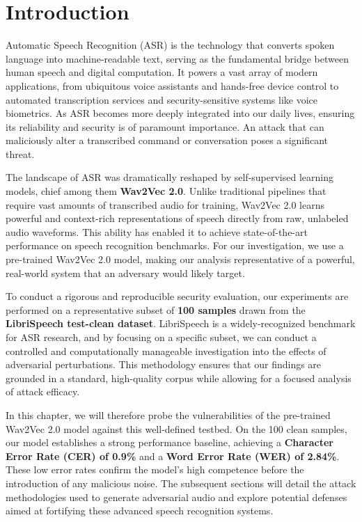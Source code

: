 \documentclass[../main.tex]{subfiles}
\begin{document}
\section{Introduction}
\label{sec:asr_intro}

Automatic Speech Recognition (ASR) is the technology that converts spoken language into machine-readable text, serving as the fundamental bridge between human speech and digital computation. It powers a vast array of modern applications, from ubiquitous voice assistants and hands-free device control to automated transcription services and security-sensitive systems like voice biometrics. As ASR becomes more deeply integrated into our daily lives, ensuring its reliability and security is of paramount importance. An attack that can maliciously alter a transcribed command or conversation poses a significant threat.

The landscape of ASR was dramatically reshaped by self-supervised learning models, chief among them \textbf{Wav2Vec 2.0}. Unlike traditional pipelines that require vast amounts of transcribed audio for training, Wav2Vec 2.0 learns powerful and context-rich representations of speech directly from raw, unlabeled audio waveforms. This ability has enabled it to achieve state-of-the-art performance on speech recognition benchmarks. For our investigation, we use a pre-trained Wav2Vec 2.0 model, making our analysis representative of a powerful, real-world system that an adversary would likely target.

To conduct a rigorous and reproducible security evaluation, our experiments are performed on a representative subset of \textbf{100 samples} drawn from the \textbf{LibriSpeech test-clean dataset}. LibriSpeech is a widely-recognized benchmark for ASR research, and by focusing on a specific subset, we can conduct a controlled and computationally manageable investigation into the effects of adversarial perturbations. This methodology ensures that our findings are grounded in a standard, high-quality corpus while allowing for a focused analysis of attack efficacy.

In this chapter, we will therefore probe the vulnerabilities of the pre-trained Wav2Vec 2.0 model against this well-defined testbed. On the 100 clean samples, our model establishes a strong performance baseline, achieving a \textbf{Character Error Rate (CER) of 0.9\%} and a \textbf{Word Error Rate (WER) of 2.84\%}. These low error rates confirm the model's high competence before the introduction of any malicious noise. The subsequent sections will detail the attack methodologies used to generate adversarial audio and explore potential defenses aimed at fortifying these advanced speech recognition systems.
\end{document}
